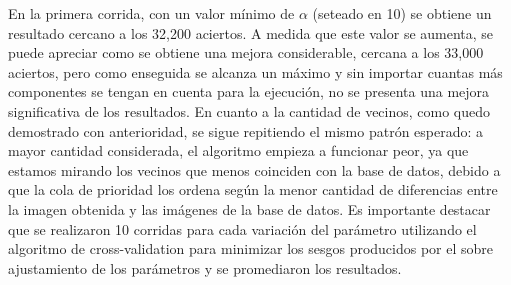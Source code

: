 En la primera corrida, con un valor mínimo de $\alpha$ (seteado en 10) se obtiene un resultado cercano a los 32,200 aciertos. A medida que este valor se aumenta, se puede apreciar como se obtiene una mejora considerable, cercana a los 33,000 aciertos, pero como enseguida se alcanza un máximo y sin importar cuantas más componentes se tengan en cuenta para la ejecución, no se presenta una mejora significativa de los resultados. En cuanto a la cantidad de vecinos, como quedo demostrado con anterioridad, se sigue repitiendo el mismo patrón esperado: a mayor cantidad considerada, el algoritmo empieza a funcionar peor, ya que estamos mirando los vecinos que menos coinciden con la base de datos, debido a que la cola de prioridad los ordena según la menor cantidad de diferencias entre la imagen obtenida y las imágenes de la base de datos. 
Es importante destacar que se realizaron 10 corridas para cada variación del parámetro utilizando el algoritmo de cross-validation para minimizar los sesgos producidos por el sobre ajustamiento de los parámetros y se promediaron los resultados.

